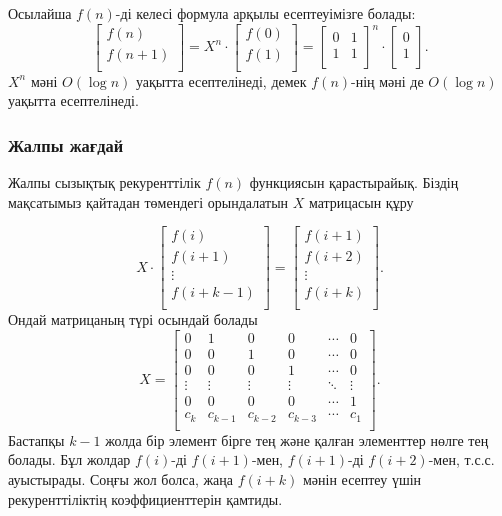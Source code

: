 Осылайша $f(n)$-ді келесі формула арқылы есептеуімізге болады:
\[
 \begin{bmatrix}
  f(n) \\
  f(n+1) \\
 \end{bmatrix}
=
X^n \cdot
 \begin{bmatrix}
  f(0) \\
  f(1) \\
 \end{bmatrix}
=
 \begin{bmatrix}
  0 & 1 \\
  1 & 1 \\
 \end{bmatrix}^n
\cdot
 \begin{bmatrix}
  0 \\
  1 \\
 \end{bmatrix}.
\]
$X^n$ мәні $O(\log n)$ уақытта есептелінеді,
демек $f(n)$-нің мәні де $O(\log n)$ уақытта 
есептелінеді. 

\subsubsection{Жалпы жағдай}

Жалпы сызықтық рекуренттілік $f(n)$ функциясын
қарастырайық. Біздің мақсатымыз қайтадан төмендегі орындалатын
$X$ матрицасын құру

\[ X \cdot
 \begin{bmatrix}
  f(i) \\
  f(i+1) \\
  \vdots \\
  f(i+k-1) \\
 \end{bmatrix}
=
 \begin{bmatrix}
  f(i+1) \\
  f(i+2) \\
  \vdots \\
  f(i+k) \\
 \end{bmatrix}.
\]
Ондай матрицаның түрі осындай болады
\[
X =
 \begin{bmatrix}
  0 & 1 & 0 & 0 & \cdots & 0 \\
  0 & 0 & 1 & 0 & \cdots & 0 \\
  0 & 0 & 0 & 1 & \cdots & 0 \\
  \vdots & \vdots & \vdots & \vdots & \ddots & \vdots \\
  0 & 0 & 0 & 0 & \cdots & 1 \\
  c_k & c_{k-1} & c_{k-2} & c_{k-3} & \cdots & c_1 \\
 \end{bmatrix}.
\]
Бастапқы $k-1$ жолда бір элемент бірге тең және қалған 
элементтер нөлге тең болады. Бұл жолдар 
$f(i)$-ді $f(i+1)$-мен, $f(i+1)$-ді $f(i+2)$-мен,
т.с.с. ауыстырады. Соңғы жол болса, жаңа $f(i+k)$ мәнін 
есептеу үшін рекуренттіліктің коэффициенттерін қамтиды.

